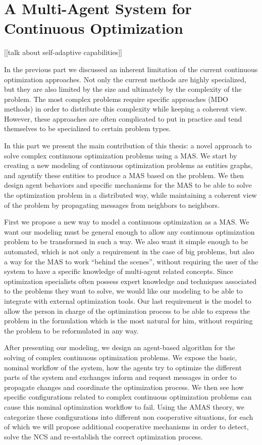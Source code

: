 \part{A Multi-Agent System for Continuous Optimization}\label{MAS4Optim_part}

[[talk about self-adaptive capabilities]]

In the previous part we discussed an inherent limitation of the current continuous optimization approaches. Not only the current methods are highly specialized, but they are also limited by the size and ultimately by the complexity of the problem. The most complex problems require specific approaches (MDO methods) in order to distribute this complexity while keeping a coherent view. However, these approaches are often complicated to put in practice and tend themselves to be specialized to certain problem types.

In this part we present the main contribution of this thesis: a novel approach to solve complex continuous optimization problems using a MAS. We start by creating a new modeling of continuous optimization problems as entities graphs, and agentify these entities to produce a MAS based on the problem. We then design agent behaviors and specific mechanisms for the MAS to be able to solve the optimization problem in a distributed way, while maintaining a coherent view of the problem by propagating messages from neighbors to neighbors. 

First we propose a new way to model a continuous optimization as a MAS. We want our modeling must be general enough to allow any continuous optimization problem to be transformed in such a way. We also want it simple enough to be automated, which is not only a requirement in the case of big problems, but also a way for the MAS to work \enquote{behind the scenes}, without requiring the user of the system to have a specific knowledge of multi-agent related concepts. Since optimization specialists often possess expert  knowledge and techniques associated to the problems they want to solve, we would like our modeling to be able to integrate with external optimization tools. Our last requirement is the model to allow the person in charge of the optimization process to be able to express the problem in the formulation which is the most natural for him, without requiring the problem to be reformulated in any way.

After presenting our modeling, we design an agent-based algorithm for the solving of complex continuous optimization problems. We expose the basic, nominal workflow of the system, how the agents try to optimize the different parts of the system and exchanges inform and request messages in order to propagate changes and coordinate the optimization process. We then see how specific configurations related to complex continuous optimization problems can cause this nominal optimization workflow to fail. Using the AMAS theory, we categorize these configurations into different non cooperative situations, for each of which we will propose additional cooperative mechanisms in  order to detect, solve the NCS and re-establish the correct optimization process.

